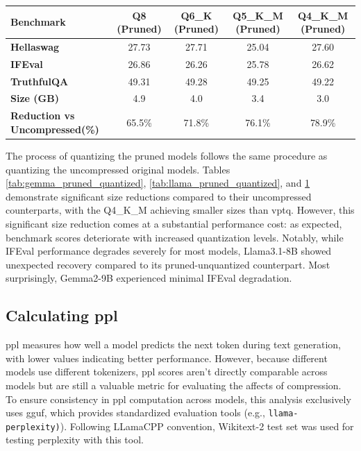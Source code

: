 \documentclass{ifacconf}
\begin{document}
\begin{strip}
\begin{minipage}{\textwidth}
			\begin{table}[H]
				\centering
				\begin{tabular}{|l|c|c|c|c|}
					\hline
					\textbf{Benchmark} & \textbf{Q8 (Pruned)} & \textbf{Q6\_K (Pruned)} & \textbf{Q5\_K\_M (Pruned)} & \textbf{Q4\_K\_M (Pruned)} \\ \hline
					\textbf{Hellaswag} & 27.73 & 27.71 & 25.04 & 27.60 \\ \hline
					\textbf{IFEval}    & 26.86 & 26.26 & 25.78 & 26.62 \\ \hline
					\textbf{TruthfulQA} & 49.31 & 49.28 & 49.25 & 49.22 \\ \hline
					\textbf{Size (GB)} & 4.9 & 4.0 & 3.4 & 3.0 \\ \hline
					\textbf{Reduction vs Uncompressed(\%)} & 65.5\% & 71.8\% & 76.1\% & 78.9\% \\ \hline
				\end{tabular}
				\label{tab:qwen_pruned_quantized}
			\end{table}
		\end{minipage}
	\end{strip}
	
	The process of quantizing the pruned models follows the same procedure as quantizing the uncompressed original models. Tables \ref{tab:gemma_pruned_quantized}, \ref{tab:llama_pruned_quantized}, and \ref{tab:qwen_pruned_quantized} demonstrate significant size reductions compared to their uncompressed counterparts, with the Q4\_K\_M achieving smaller sizes than \gls{vptq}. However, this significant size reduction comes at a substantial performance cost: as expected, benchmark scores deteriorate with increased quantization levels. Notably, while IFEval performance degrades severely for most models, Llama3.1-8B showed unexpected recovery compared to its pruned-unquantized counterpart. Most surprisingly, Gemma2-9B experienced minimal IFEval degradation.
	
	\subsection{Calculating \gls{ppl}}
	\gls{ppl} measures how well a model predicts the next token during text generation, with lower values indicating better performance. However, because different models use different tokenizers, \gls{ppl} scores aren't directly comparable across models but are still a valuable metric for evaluating the affects of compression. To ensure consistency in \gls{ppl} computation across models, this analysis exclusively uses \gls{gguf}, which provides standardized evaluation tools (e.g., \verb|llama-perplexity)|). Following LLamaCPP convention, Wikitext-2 test set was used for testing perplexity with this tool.
	
\end{document}
